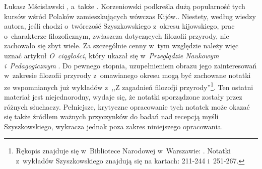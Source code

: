 \begin{artplenv}{Łukasz Mścisławski}
{%
\parencite[][]{kaminski_wyzsze_1917}, %
 a~także 
\parencite[][s.~229-236]{korzeniowski_za_2009}. %
Korzeniowski podkreśla dużą popularność tych kursów wśród Polaków zamieszkujących wówczas Kijów.}. Niestety, według wiedzy autora, jeśli chodzi o~twórczość Szyszkowskiego z~okresu kijowskiego, prac o~charakterze filozoficznym, zwłaszcza dotyczących filozofii przyrody, nie zachowało się zbyt wiele. Za szczególnie cenny w~tym względzie należy więc uznać artykuł \textit{O~ciągłości}, który ukazał się w~\textit{Przeglądzie Naukowym i~Pedagogicznym} 
\parencite[][]{szyszkowski_o_1916}. %
 Do pewnego stopnia, uzupełnieniem obrazu jego zainteresowań w~zakresie filozofii przyrody z~omawianego okresu mogą być zachowane notatki ze wspomnianych już wykładów z~,,Z zagadnień filozofji przyrody''\footnote{Rękopis znajduje się w~Bibliotece Narodowej w~Warszawie: 
\parencite*[][]{noauthor_noty_1917}. %
 Notatki z~wykładów Szyszkowskiego znajdują się na kartach: 211-244 i~251-267.}. Ten ostatni materiał jest niejednorodny, wydaje się, że notatki sporządzone zostały przez różnych słuchaczy. Pełniejsze, krytyczne opracowanie tych notatek może okazać się także źródłem ważnych przyczynków do badań nad recepcją myśli Szyszkowskiego, wykracza jednak poza zakres niniejszego opracowania.


\end{artplenv}
